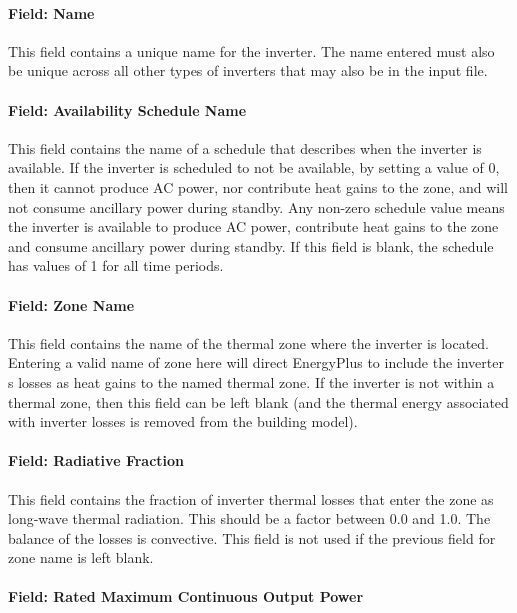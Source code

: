 \paragraph{Field: Name}\label{field-name-4-008}

This field contains a unique name for the inverter. The name entered must also be unique across all other types of inverters that may also be in the input file.

\paragraph{Field: Availability Schedule Name}\label{field-availability-schedule-name-3-001}

This field contains the name of a schedule that describes when the inverter is available. If the inverter is scheduled to not be available, by setting a value of 0, then it cannot produce AC power, nor contribute heat gains to the zone, and will not consume ancillary power during standby. Any non-zero schedule value means the inverter is available to produce AC power, contribute heat gains to the zone and consume ancillary power during standby. If this field is blank, the schedule has values of 1 for all time periods.

\paragraph{Field: Zone Name}\label{field-zone-name-3-000}

This field contains the name of the thermal zone where the inverter is located. Entering a valid name of zone here will direct EnergyPlus to include the inverter s losses as heat gains to the named thermal zone. If the inverter is not within a thermal zone, then this field can be left blank (and the thermal energy associated with inverter losses is removed from the building model).

\paragraph{Field: Radiative Fraction}\label{field-radiative-fraction-3}

This field contains the fraction of inverter thermal losses that enter the zone as long-wave thermal radiation. This should be a factor between 0.0 and 1.0. The balance of the losses is convective. This field is not used if the previous field for zone name is left blank.

\paragraph{Field: Rated Maximum Continuous Output Power}\label{field-rated-maximum-continuous-output-power}


